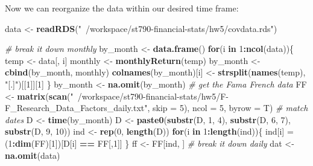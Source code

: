 \documentclass[11pt,]{article}
\newenvironment{Shaded}{\begin{snugshade}}{\end{snugshade}}
\newcommand{\CommentTok}[1]{\textcolor[rgb]{0.56,0.35,0.01}{\textit{#1}}}
\newcommand{\ControlFlowTok}[1]{\textcolor[rgb]{0.13,0.29,0.53}{\textbf{#1}}}
\newcommand{\DataTypeTok}[1]{\textcolor[rgb]{0.13,0.29,0.53}{#1}}
\newcommand{\DecValTok}[1]{\textcolor[rgb]{0.00,0.00,0.81}{#1}}
\newcommand{\KeywordTok}[1]{\textcolor[rgb]{0.13,0.29,0.53}{\textbf{#1}}}
\newcommand{\NormalTok}[1]{#1}
\newcommand{\OperatorTok}[1]{\textcolor[rgb]{0.81,0.36,0.00}{\textbf{#1}}}
\newcommand{\StringTok}[1]{\textcolor[rgb]{0.31,0.60,0.02}{#1}}
\begin{document}
Now we can reorganize the data within our desired time frame:

\begin{Shaded}
\begin{Highlighting}[]
\NormalTok{data <-}\StringTok{ }\KeywordTok{readRDS}\NormalTok{(}\StringTok{"~/workspace/st790-financial-stats/hw5/covdata.rds"}\NormalTok{)}

\CommentTok{# break it down monthly }
\NormalTok{by_month <-}\StringTok{ }\KeywordTok{data.frame}\NormalTok{() }
\ControlFlowTok{for}\NormalTok{(i }\ControlFlowTok{in} \DecValTok{1}\OperatorTok{:}\KeywordTok{ncol}\NormalTok{(data))\{}
\NormalTok{  temp <-}\StringTok{ }\NormalTok{data[, i]}
\NormalTok{  monthly <-}\StringTok{ }\KeywordTok{monthlyReturn}\NormalTok{(temp)}
\NormalTok{  by_month <-}\StringTok{ }\KeywordTok{cbind}\NormalTok{(by_month, monthly)}
  \KeywordTok{colnames}\NormalTok{(by_month)[i] <-}\StringTok{ }\KeywordTok{strsplit}\NormalTok{(}\KeywordTok{names}\NormalTok{(temp), }\StringTok{"[.]"}\NormalTok{)[[}\DecValTok{1}\NormalTok{]][}\DecValTok{1}\NormalTok{]}
\NormalTok{\}}
\NormalTok{by_month <-}\StringTok{ }\KeywordTok{na.omit}\NormalTok{(by_month)}
\CommentTok{# get the Fama French data }
\NormalTok{FF <-}\StringTok{ }\KeywordTok{matrix}\NormalTok{(}\KeywordTok{scan}\NormalTok{(}\StringTok{"~/workspace/st790-financial-stats/hw5/F-F_Research_Data_Factors_daily.txt"}\NormalTok{, }\DataTypeTok{skip =} \DecValTok{5}\NormalTok{), }\DataTypeTok{ncol =} \DecValTok{5}\NormalTok{, }\DataTypeTok{byrow =}\NormalTok{ T)}
\CommentTok{# match dates }
\NormalTok{D <-}\StringTok{ }\KeywordTok{time}\NormalTok{(by_month)}
\NormalTok{D <-}\StringTok{ }\KeywordTok{paste0}\NormalTok{(}\KeywordTok{substr}\NormalTok{(D, }\DecValTok{1}\NormalTok{, }\DecValTok{4}\NormalTok{),}
            \KeywordTok{substr}\NormalTok{(D, }\DecValTok{6}\NormalTok{, }\DecValTok{7}\NormalTok{), }
            \KeywordTok{substr}\NormalTok{(D, }\DecValTok{9}\NormalTok{, }\DecValTok{10}\NormalTok{))}
\NormalTok{ind <-}\StringTok{ }\KeywordTok{rep}\NormalTok{(}\DecValTok{0}\NormalTok{, }\KeywordTok{length}\NormalTok{(D))}
\ControlFlowTok{for}\NormalTok{(i }\ControlFlowTok{in} \DecValTok{1}\OperatorTok{:}\KeywordTok{length}\NormalTok{(ind))\{}
\NormalTok{  ind[i] =}\StringTok{ }\NormalTok{(}\DecValTok{1}\OperatorTok{:}\KeywordTok{dim}\NormalTok{(FF)[}\DecValTok{1}\NormalTok{])[D[i] }\OperatorTok{==}\StringTok{ }\NormalTok{FF[,}\DecValTok{1}\NormalTok{]]}
\NormalTok{\}}
\NormalTok{ff <-}\StringTok{ }\NormalTok{FF[ind, ]}
\CommentTok{# break it down daily  }
\NormalTok{dat <-}\StringTok{ }\KeywordTok{na.omit}\NormalTok{(data)}

\end{Highlighting}
\end{Shaded}
\end{document}
